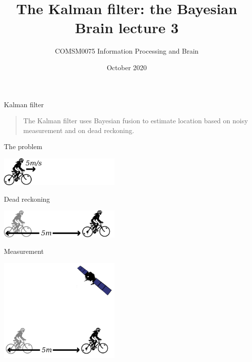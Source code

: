 \documentclass{beamer}
\title[The Bayesian Brain lecture 3]{The Kalman filter: the Bayesian Brain lecture 3}
\author{COMSM0075 Information Processing and Brain}
\institute{\texttt{comsm0075.github.io}}
\date{October 2020}
\begin{document}
\maketitle



\begin{frame}{Kalman filter}
  \begin{quote}
The Kalman filter uses Bayesian fusion to estimate location based on noisy measurement and on dead reckoning.
  \end{quote}

\end{frame}

\begin{frame}{The problem}
\begin{center}
\includegraphics[width=6cm]{cyclist1.png}
\end{center}
\end{frame}


\begin{frame}{Dead reckoning}
\begin{center}
\includegraphics[width=6cm]{cyclist2.png}
\end{center}
\end{frame}


\begin{frame}{Measurement}
\begin{center}
\includegraphics[width=6cm]{cyclist_gps.png}
\end{center}
\end{frame}
\end{document}
